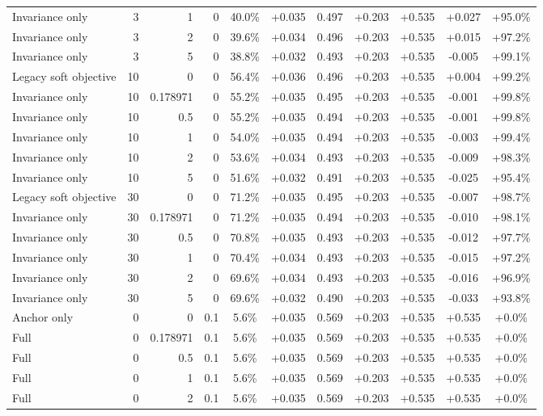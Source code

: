 \begin{table}[htbp]
\begin{tabular}{lrrrccccccc}
Invariance only & 3 & 1 & 0 & 40.0\% & +0.035 & 0.497 & +0.203 & +0.535 & +0.027 & +95.0\% \\
Invariance only & 3 & 2 & 0 & 39.6\% & +0.034 & 0.496 & +0.203 & +0.535 & +0.015 & +97.2\% \\
Invariance only & 3 & 5 & 0 & 38.8\% & +0.032 & 0.493 & +0.203 & +0.535 & -0.005 & +99.1\% \\
Legacy soft objective & 10 & 0 & 0 & 56.4\% & +0.036 & 0.496 & +0.203 & +0.535 & +0.004 & +99.2\% \\
Invariance only & 10 & 0.178971 & 0 & 55.2\% & +0.035 & 0.495 & +0.203 & +0.535 & -0.001 & +99.8\% \\
Invariance only & 10 & 0.5 & 0 & 55.2\% & +0.035 & 0.494 & +0.203 & +0.535 & -0.001 & +99.8\% \\
Invariance only & 10 & 1 & 0 & 54.0\% & +0.035 & 0.494 & +0.203 & +0.535 & -0.003 & +99.4\% \\
Invariance only & 10 & 2 & 0 & 53.6\% & +0.034 & 0.493 & +0.203 & +0.535 & -0.009 & +98.3\% \\
Invariance only & 10 & 5 & 0 & 51.6\% & +0.032 & 0.491 & +0.203 & +0.535 & -0.025 & +95.4\% \\
Legacy soft objective & 30 & 0 & 0 & 71.2\% & +0.035 & 0.495 & +0.203 & +0.535 & -0.007 & +98.7\% \\
Invariance only & 30 & 0.178971 & 0 & 71.2\% & +0.035 & 0.494 & +0.203 & +0.535 & -0.010 & +98.1\% \\
Invariance only & 30 & 0.5 & 0 & 70.8\% & +0.035 & 0.493 & +0.203 & +0.535 & -0.012 & +97.7\% \\
Invariance only & 30 & 1 & 0 & 70.4\% & +0.034 & 0.493 & +0.203 & +0.535 & -0.015 & +97.2\% \\
Invariance only & 30 & 2 & 0 & 69.6\% & +0.034 & 0.493 & +0.203 & +0.535 & -0.016 & +96.9\% \\
Invariance only & 30 & 5 & 0 & 69.6\% & +0.032 & 0.490 & +0.203 & +0.535 & -0.033 & +93.8\% \\
Anchor only & 0 & 0 & 0.1 & 5.6\% & +0.035 & 0.569 & +0.203 & +0.535 & +0.535 & +0.0\% \\
Full & 0 & 0.178971 & 0.1 & 5.6\% & +0.035 & 0.569 & +0.203 & +0.535 & +0.535 & +0.0\% \\
Full & 0 & 0.5 & 0.1 & 5.6\% & +0.035 & 0.569 & +0.203 & +0.535 & +0.535 & +0.0\% \\
Full & 0 & 1 & 0.1 & 5.6\% & +0.035 & 0.569 & +0.203 & +0.535 & +0.535 & +0.0\% \\
Full & 0 & 2 & 0.1 & 5.6\% & +0.035 & 0.569 & +0.203 & +0.535 & +0.535 & +0.0\% \\

\end{tabular}
\end{table}
